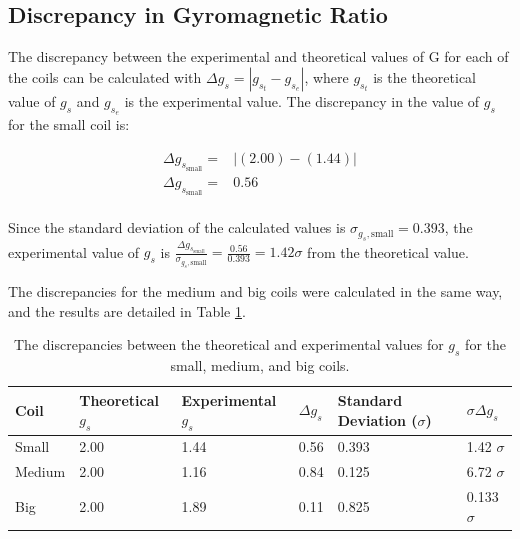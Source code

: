 \documentclass[a4paper]{article}
\begin{document}
\subsection{Discrepancy in Gyromagnetic Ratio}
\qq The discrepancy between the experimental and theoretical values of G for
each of the coils can be calculated with \( \Delta g_s = | g_{s_t} - g_{s_e} |
\), where \( g_{s_t} \) is the theoretical value of \( g_s \) and \( g_{s_e} \)
is the experimental value. The discrepancy in the value of \( g_s \) for the
small coil is:

\begin{align*}
  \Delta g_{s_{\text{small}}} =& \left| (2.00) - (1.44) \right| \\
  \Delta g_{s_{\text{small}}} =& 0.56 \\
\end{align*}

Since the standard deviation of the calculated values is
\( \sigma_{g_s, \text{small}} = 0.393 \), the experimental value of \( g_s \) is \(
\frac{\Delta g_{s_{\text{small}}}}{\sigma_{g_s, \text{small}}} = \frac{0.56}{0.393} = 1.42
\sigma \) from the theoretical value.

\qq The discrepancies for the medium and big coils were calculated in the same
way, and the results are detailed in Table \ref{tab:discrepancyG}.

\begin{table}[H]
  \caption{The discrepancies between the theoretical and experimental values for
    \( g_s \) for the small, medium, and big coils.}
  \begin{center}
    \begin{tabular}{|l|l|l|l|l|l|}
      \hline
      Coil & Theoretical \( g_s \) & Experimental \( g_s \) & \( \Delta g_s \) &
                                                                                 Standard
                                                                                 Deviation
                                                                                 (\(
                                                                                 \sigma
                                                                                 \)) &
                                                                                 \(
                                                                                 \sigma
                                                                                 \Delta
                                                                                 g_s
                                                                                 \)
      \\
      \hline
      Small & 2.00 & 1.44 & 0.56 & 0.393 & 1.42 \( \sigma \) \\
      Medium & 2.00 & 1.16 & 0.84 & 0.125 & 6.72 \( \sigma \) \\
      Big & 2.00 & 1.89 & 0.11 & 0.825 & 0.133 \( \sigma \) \\
      \hline
    \end{tabular}
  \end{center}
  \label{tab:discrepancyG}
\end{table}
\end{document}
